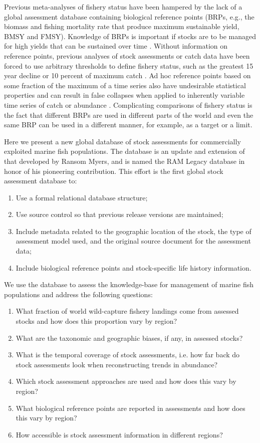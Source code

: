 \documentclass[letterpaper,12pt]{article}
\begin{document}
Previous meta-analyses of fishery status have been hampered by the
lack of a global assessment database containing biological reference
points (BRPs, e.g., the biomass and fishing mortality rate that
produce maximum sustainable yield, BMSY and FMSY).  Knowledge of BRPs
is important if stocks are to be managed for high yields that can be
sustained over time \citep{Mace:1994:cjfas}.  Without information on
reference points, previous analyses of stock assessments or catch data
have been forced to use arbitrary thresholds to define fishery status,
such as the greatest 15 year decline
\citep{Hutchings:Reynolds:2004:biosci} or 10 percent of maximum catch
\citep{Worm:etal:2006:science}. Ad hoc reference points based on some
fraction of the maximum of a time series also have undesirable
statistical properties and can result in false collapses when applied
to inherently variable time series of catch or abundance
\citep{Wilberg:Miller:2007:science, branch:2008:marpol}.  Complicating
comparisons of fishery status is the fact that different BRPs are used
in different parts of the world and even the same BRP can be used in a
different manner, for example, as a target or a limit.

Here we present a new global database of stock assessments for
commercially exploited marine fish populations.  The database is an
update and extension of that developed by Ransom Myers, and is named
the RAM Legacy database in honor of his pioneering contribution.  This
effort is the first global stock assessment database to:
\begin{enumerate}
\item Use a formal relational database structure;
\item Use source control so that previous release versions are maintained;
\item Include metadata related to the geographic location of the stock, the type of assessment model used, and the original source document for the assessment data;
\item Include biological reference points and stock-specific life history information. 
\end{enumerate}

We use the database to assess the knowledge-base for management of marine fish populations and address the following questions:
\begin{enumerate}
\item What fraction of world wild-capture fishery landings come from assessed stocks and how does this proportion vary by region?
\item What are the taxonomic and geographic biases, if any, in assessed stocks?
\item What is the temporal coverage of stock assessments, i.e. how far back do stock assessments look when reconstructing trends in abundance?
\item Which stock assessment approaches are used and how does this vary by region?
\item What biological reference points are reported in assessments and how does this vary by region?
\item How accessible is stock assessment information in different regions?
\end{enumerate}
\end{document}
